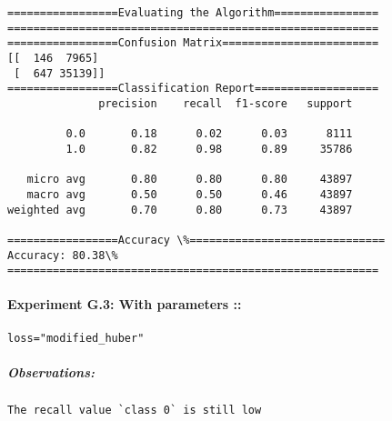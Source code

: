 \documentclass[11pt]{article}
\begin{document}
    \begin{Verbatim}[commandchars=\\\{\}]
=================Evaluating the Algorithm================
=========================================================
=================Confusion Matrix========================
[[  146  7965]
 [  647 35139]]
=================Classification Report===================
              precision    recall  f1-score   support

         0.0       0.18      0.02      0.03      8111
         1.0       0.82      0.98      0.89     35786

   micro avg       0.80      0.80      0.80     43897
   macro avg       0.50      0.50      0.46     43897
weighted avg       0.70      0.80      0.73     43897

=================Accuracy \%==============================
Accuracy: 80.38\%
=========================================================

    \end{Verbatim}

    \paragraph{Experiment G.3: With parameters
::}\label{experiment-g.3-with-parameters}

\begin{verbatim}
loss="modified_huber"
\end{verbatim}

\subparagraph{Observations:}\label{observations}

\begin{verbatim}
The recall value `class 0` is still low
\end{verbatim}
\end{document}
